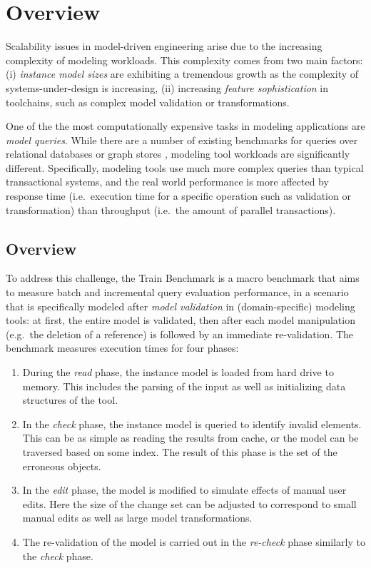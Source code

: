 \chapter{Overview}

Scalability issues in model-driven engineering arise due to the increasing
complexity of modeling workloads. This complexity comes from two main factors:
(i) \emph{instance model sizes} are exhibiting a tremendous growth as the
complexity of systems-under-design is increasing, (ii) increasing \emph{feature
sophistication} in toolchains, such as complex model validation or
transformations.

One of the the most computationally expensive tasks in modeling applications are
\emph{model queries}. While there are a number of existing benchmarks for
queries over relational databases \cite{tpc-c} or graph stores
\cite{BerlinBenchmark, SP2Bench}, modeling tool workloads are significantly
different. Specifically, modeling tools use much more complex queries than
typical transactional systems, and the real world performance is more affected by
response time (i.e.\ execution time for a specific operation such as validation
or transformation) than throughput (i.e.\ the amount of parallel transactions).


\section{Overview}
To address this challenge, the Train Benchmark \cite{TB:SCP2013,TBwebsite} is a macro
benchmark that aims to measure batch and incremental query evaluation
performance, in a scenario that is specifically modeled after \emph{model
validation} in (domain-specific) modeling tools: at first, the entire model is
validated, then after each model manipulation (e.g.\ the deletion of a
reference) is followed by an immediate re-validation. The benchmark measures
execution times for four phases:

\begin{enumerate}
 \item During the \emph{read} phase, the instance model
 is loaded from hard drive to memory. This includes the parsing of the input as
 well as initializing data structures of the tool. 
 
 \item In the \emph{check} phase, the instance model is queried to identify
 invalid elements. This can be as simple as reading the results from cache, or
 the model can be traversed based on some index. The result of this phase  
 is the set of the erroneous objects.
 
 \item In the \emph{edit} phase, the model is modified to simulate effects of
 manual user edits. Here the size of the change set can be adjusted to
 correspond to small manual edits as well as large model transformations.
 
 \item The re-validation of the model is carried out in the \emph{re-check}
 phase similarly to the \emph{check} phase.
\end{enumerate}

